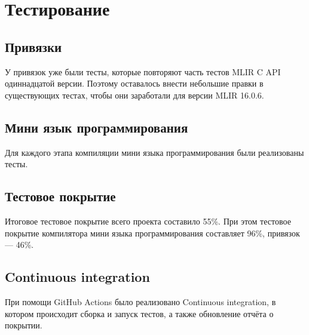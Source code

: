 
\section{Тестирование}

\subsection*{Привязки}

У привязок уже были тесты, которые повторяют часть тестов  ML\-IR C API одиннадцатой версии. Поэтому оставалось внести небольшие правки в существующих тестах, чтобы они заработали для версии ML\-IR 16.0.6.

\subsection*{Мини язык программирования}

Для каждого этапа компиляции мини языка программирования были реализованы тесты.

\subsection*{Тестовое покрытие}

Итоговое тестовое покрытие всего проекта составило 55\%. При этом тестовое покрытие компилятора мини языка программирования составляет 96\%, привязок --- 46\%.

\subsection*{Continuous integration}

При помощи GitHub Actions было реализовано Continuous integra\-tion, в котором происходит сборка и запуск тестов, а также обновление отчёта о покрытии.
